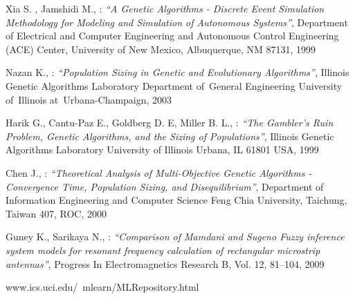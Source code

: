 \begin{thebibliography}{99}
	Xia S. , Jamshidi M., : \textit{``A Genetic Algorithms - Discrete Event Simulation
	Methodology for Modeling and Simulation of Autonomous Systems''},
	Department of Electrical and Computer Engineering and Autonomous Control Engineering
	(ACE) Center, University of New Mexico, Albuquerque, NM 87131, 1999

	Nazan K., : \textit{``Population Sizing in Genetic and Evolutionary Algorithms''},
	Illinois Genetic Algorithms Laboratory Department of~General Engineering University 
	of~Illinois at~Urbana-Champaign, 2003

	Harik G., Cantu-Paz E., Goldberg D. E, Miller B. L., : \textit{``The Gambler’s Ruin Problem, Genetic Algorithms, and the Sizing of Populations''}, 
	Illinois Genetic Algorithms Laboratory University of Illinois Urbana, IL
	61801 USA, 1999

	Chen J., : \textit{``Theoretical Analysis of Multi-Objective Genetic
	Algorithms - Convergence Time, Population Sizing, and Disequilibrium''}, 
	Department of Information Engineering and Computer Science Feng Chia University,
	Taichung, Taiwan 407, ROC, 2000

	Guney K., Sarikaya N., : \textit{``Comparison of Mamdani and Sugeno Fuzzy
    inference system models for resonant frequency calculation of rectangular
    microstrip antennas''}, Progress In Electromagnetics Research B, Vol. 12,
    81–104, 2009

    www.ics.uci.edu/~mlearn/MLRepository.html

\end{thebibliography}
\newpage
\listoffigures
\listoftables

